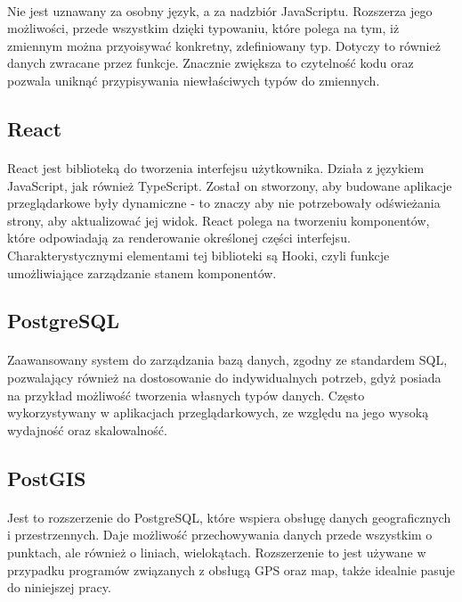 \paragraph{}
Nie jest uznawany za osobny język, a za nadzbiór JavaScriptu. Rozszerza jego możliwości, przede wszystkim dzięki typowaniu, które polega na tym, iż zmiennym można przyoisywać konkretny, zdefiniowany typ. Dotyczy to również danych zwracane przez funkcje. Znacznie zwiększa to czytelność kodu oraz pozwala uniknąć przypisywania niewłaściwych typów do zmiennych.

\subsection{React}
\paragraph{}
React jest biblioteką do tworzenia interfejsu użytkownika. Działa z językiem JavaScript, jak również TypeScript. Został on stworzony, aby budowane aplikacje przeglądarkowe były dynamiczne - to znaczy aby nie potrzebowały odświeżania strony, aby aktualizować jej widok. React polega na tworzeniu komponentów, które odpowiadają za renderowanie określonej części interfejsu. Charakterystycznymi elementami tej biblioteki są Hooki, czyli funkcje umożliwiające zarządzanie stanem komponentów.

\subsection{PostgreSQL}
\paragraph{}
Zaawansowany system do zarządzania bazą danych, zgodny ze standardem SQL, pozwalający również na dostosowanie do indywidualnych potrzeb, gdyż posiada na przykład możliwość tworzenia własnych typów danych. Często wykorzystywany w aplikacjach przeglądarkowych, ze względu na jego wysoką wydajność oraz skalowalność.

\subsection{PostGIS}
\paragraph{} 
Jest to rozszerzenie do PostgreSQL, które wspiera obsługę danych geograficznych i przestrzennych. Daje możliwość przechowywania danych przede wszystkim o punktach, ale również o liniach, wielokątach. Rozszerzenie to jest używane w przypadku programów związanych z obsługą GPS oraz map, także idealnie pasuje do niniejszej pracy.

